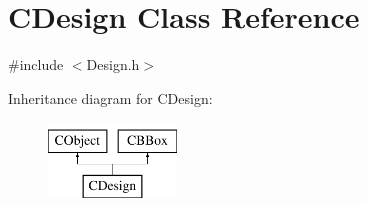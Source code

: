 \hypertarget{classCDesign}{}\section{C\+Design Class Reference}
\label{classCDesign}


{\ttfamily \#include $<$Design.\+h$>$}

Inheritance diagram for C\+Design\+:\begin{figure}[H]
\begin{center}
\leavevmode
\includegraphics[height=2.000000cm]{classCDesign}
\end{center}
\end{figure}
